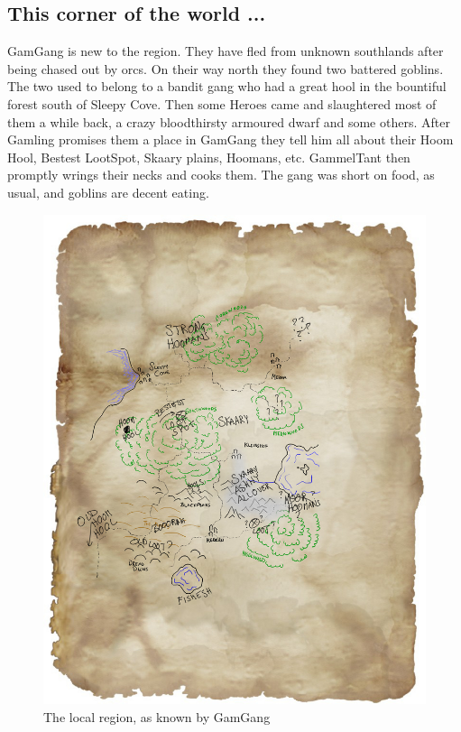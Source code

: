 \subsection*{This corner of the world ...}

GamGang is new to the region. They have fled from unknown southlands after being chased out by orcs. On their way north they found two battered goblins. The two used to belong to a bandit gang who had a great hool in the bountiful forest south of Sleepy Cove. Then some Heroes came and slaughtered most of them a while back, a crazy bloodthirsty armoured dwarf and some others. After Gamling promises them a place in GamGang they tell him all about their Hoom Hool, Bestest LootSpot, Skaary plains, Hoomans, etc. GammelTant then promptly wrings their necks and cooks them. The gang was short on food, as usual, and goblins are decent eating.

\begin{figure}[h!]
  \centering
  \includegraphics[width=0.999\textwidth]{fig/region.jpg}
  \caption*{The local region, as known by GamGang}
\end{figure}

